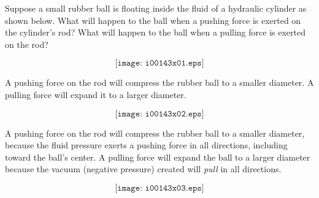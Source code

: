 

Suppose a small rubber ball is floating inside the fluid of a hydraulic cylinder as shown below.  What will happen to the ball when a pushing force is exerted on the cylinder's rod?  What will happen to the ball when a pulling force is exerted on the rod?

$$\texttt{[image: i00143x01.eps]}$$







A pushing force on the rod will compress the rubber ball to a smaller diameter.  A pulling force will expand it to a larger diameter.

$$\texttt{[image: i00143x02.eps]}$$







A pushing force on the rod will compress the rubber ball to a smaller diameter, because the fluid pressure exerts a pushing force in all directions, including toward the ball's center.  A pulling force will expand the ball to a larger diameter because the vacuum (negative pressure) created will {\it pull} in all directions. 

$$\texttt{[image: i00143x03.eps]}$$





